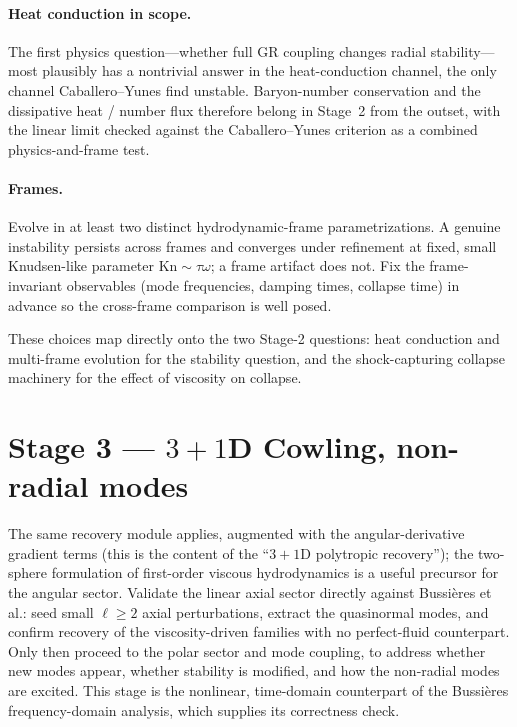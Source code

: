 \documentclass[11pt]{article}
\begin{document}
\paragraph{Heat conduction in scope.}
The first physics question---whether full GR coupling changes radial
stability---most plausibly has a nontrivial answer in the heat-conduction channel,
the only channel Caballero--Yunes find unstable. Baryon-number conservation and the
dissipative heat / number flux therefore belong in Stage~2 from the outset, with
the linear limit checked against the Caballero--Yunes criterion as a combined
physics-and-frame test.

\paragraph{Frames.}
Evolve in at least two distinct hydrodynamic-frame parametrizations. A genuine
instability persists across frames and converges under refinement at fixed, small
Knudsen-like parameter $\mathrm{Kn}\sim\tau\omega$; a frame artifact does not. Fix
the frame-invariant observables (mode frequencies, damping times, collapse time)
in advance so the cross-frame comparison is well posed.

\medskip
\noindent These choices map directly onto the two Stage-2 questions: heat
conduction and multi-frame evolution for the stability question, and the
shock-capturing collapse machinery for the effect of viscosity on collapse.

\section{Stage 3 --- $3{+}1$D Cowling, non-radial modes}
The same recovery module applies, augmented with the angular-derivative gradient
terms (this is the content of the ``$3{+}1$D polytropic recovery''); the two-sphere
formulation of first-order viscous hydrodynamics \cite{KeeblePretorius2025} is a
useful precursor for the angular sector. Validate the linear axial sector directly
against Bussi\`eres et al.: seed small $\ell\ge 2$ axial perturbations, extract the
quasinormal modes, and confirm recovery of the viscosity-driven families with no
perfect-fluid counterpart. Only then proceed to the polar sector and mode coupling,
to address whether new modes appear, whether stability is modified, and how the
non-radial modes are excited. This stage is the nonlinear, time-domain counterpart
of the Bussi\`eres frequency-domain analysis, which supplies its correctness check.
\end{document}
